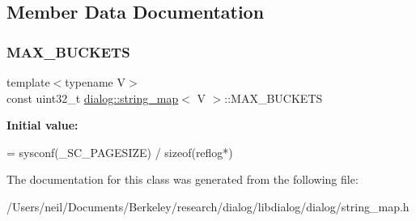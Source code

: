 \subsection{Member Data Documentation}
\mbox{\label{classdialog_1_1string__map_ac909ed9a75f2bba1b41649383df1290d}} 
\subsubsection{\texorpdfstring{M\+A\+X\+\_\+\+B\+U\+C\+K\+E\+TS}{MAX\_BUCKETS}}
{\footnotesize\ttfamily template$<$typename V$>$ \\
const uint32\+\_\+t \hyperlink{classdialog_1_1string__map}{dialog\+::string\+\_\+map}$<$ V $>$\+::M\+A\+X\+\_\+\+B\+U\+C\+K\+E\+TS\hspace{0.3cm}{\ttfamily [static]}}

{\bfseries Initial value\+:}
\begin{DoxyCode}
= sysconf(\_SC\_PAGESIZE)
    / \textcolor{keyword}{sizeof}(reflog*)
\end{DoxyCode}


The documentation for this class was generated from the following file\+:\begin{DoxyCompactItemize}
\item 
/\+Users/neil/\+Documents/\+Berkeley/research/dialog/libdialog/dialog/string\+\_\+map.\+h\end{DoxyCompactItemize}
